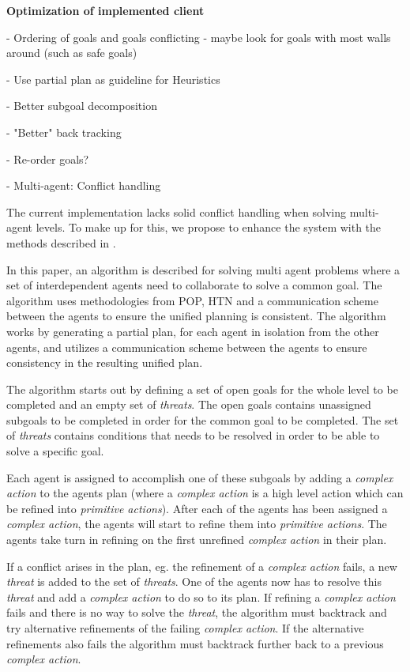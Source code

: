 \documentclass[Main]{subfiles}
\begin{document}
\textbf{Optimization of implemented client}


- Ordering of goals and goals conflicting - maybe look for goals with most walls around (such as safe goals)

- Use partial plan as guideline for Heuristics

- Better subgoal decomposition

- "Better" back tracking

- Re-order goals?

- Multi-agent: Conflict handling

The current implementation lacks solid conflict handling when solving multi-agent levels. To make up for this, we propose to enhance the system with the methods described in \cite{pellier2007unified}.

In this paper, an algorithm is described for solving multi agent problems where a set of interdependent agents need to collaborate to solve a common goal.
The algorithm uses methodologies from POP, HTN and a communication scheme between the agents to ensure the unified planning is consistent.
The algorithm works by generating a partial plan, for each agent in isolation from the other agents, and utilizes a communication scheme between the agents to ensure consistency in the resulting unified plan.

The algorithm starts out by defining a set of open goals for the whole level to be completed and an empty set of \textit{threats}.
The open goals contains unassigned subgoals to be completed in order for the common goal to be completed.
The set of \textit{threats} contains conditions that needs to be resolved in order to be able to solve a specific goal.

Each agent is assigned to accomplish one of these subgoals by adding a \textit{complex action} to the agents plan (where a \textit{complex action} is a high level action which can be refined into \textit{primitive actions}).
After each of the agents has been assigned a \textit{complex action}, the agents will start to refine them into \textit{primitive actions}.
The agents take turn in refining on the first unrefined \textit{complex action} in their plan.

If a conflict arises in the plan, eg. the refinement of a \textit{complex action} fails, a new \textit{threat} is added to the set of \textit{threats}.
One of the agents now has to resolve this \textit{threat} and add a \textit{complex action} to do so to its plan.
If refining a \textit{complex action} fails and there is no way to solve the \textit{threat}, the algorithm must backtrack and try alternative refinements of the failing \textit{complex action}. If the alternative refinements also fails the algorithm must backtrack further back to a previous \textit{complex action}.
\end{document}
